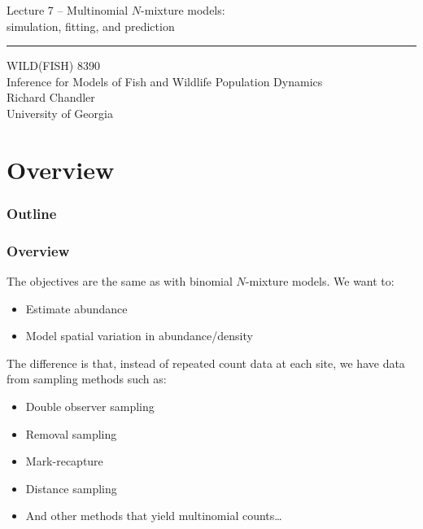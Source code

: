 \documentclass[color=usenames,dvipsnames]{beamer}\usepackage[]{graphicx}\usepackage[]{xcolor}
\begin{document}
\begin{frame}[plain]
  \LARGE
  \centering
  {\LARGE Lecture 7 -- Multinomial $N$-mixture models: \\ simulation, fitting, and prediction} \\
  {\color{default} \rule{\textwidth}{0.1pt}}
  \vfill
  \large
  WILD(FISH) 8390 \\
  Inference for Models of Fish and Wildlife Population Dynamics \\
  \vfill
  \large
  Richard Chandler \\
  University of Georgia \\
\end{frame}



\section{Overview}



\begin{frame}[plain]
  \frametitle{Outline}
  \Large
\end{frame}



\begin{frame}
  \frametitle{Overview}
  The objectives are the same as with binomial $N$-mixture models. %
  We want to:
  \begin{itemize}
    \item Estimate abundance
    \item Model spatial variation in abundance/density
  \end{itemize}
  \pause
  \vfill
  The difference is that, instead of repeated count data at each site,
  we have data from sampling methods such as:
  \begin{itemize}
    \item<3-> Double observer sampling
    \item<3-> Removal sampling
    \item<3-> Mark-recapture
    \item<3-> Distance sampling
    \item<3-> And other methods that yield multinomial counts\dots
  \end{itemize}
\end{frame}
\end{document}
